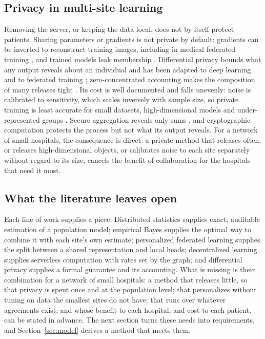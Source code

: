 \documentclass[acmsmall,screen,review]{acmart}
\theoremstyle{acmdefinition}
\begin{document}
\subsection{Privacy in multi-site learning}\label{sec:dp}

Removing the server, or keeping the data local, does not by itself protect patients. Sharing parameters or gradients is not private by default: gradients can be inverted to reconstruct training images, including in medical federated training \cite{geiping2020inverting,hatamizadeh2023do,zhu2019deep}, and trained models leak membership \cite{shokri2017membership}. Differential privacy bounds what any output reveals about an individual \cite{dwork2006calibrating,dwork2014algorithmic} and has been adapted to deep learning \cite{abadi2016deep,mironov2017renyi} and to federated training \cite{mcmahan2018learning}; zero-concentrated accounting makes the composition of many releases tight \cite{bun2016concentrated}. Its cost is well documented and falls unevenly: noise is calibrated to sensitivity, which scales inversely with sample size, so private training is least accurate for small datasets, high-dimensional models and under-represented groups \cite{bagdasaryan2019differential,tramer2021differentially}. Secure aggregation reveals only sums \cite{bonawitz2017practical}, and cryptographic computation protects the process but not what its output reveals. For a network of small hospitals, the consequence is direct: a private method that releases often, or releases high-dimensional objects, or calibrates noise to each site separately without regard to its size, cancels the benefit of collaboration for the hospitals that need it most.

\subsection{What the literature leaves open}\label{sec:gap}

Each line of work supplies a piece. Distributed statistics supplies exact, auditable estimation of a population model; empirical Bayes supplies the optimal way to combine it with each site's own estimate; personalized federated learning supplies the split between a shared representation and local heads; decentralized learning supplies serverless computation with rates set by the graph; and differential privacy supplies a formal guarantee and its accounting. What is missing is their combination for a network of small hospitals: a method that releases little, so that privacy is spent once and at the population level; that personalizes without tuning on data the smallest sites do not have; that runs over whatever agreements exist; and whose benefit to each hospital, and cost to each patient, can be stated in advance. The next section turns these needs into requirements, and Section~\ref{sec:model} derives a method that meets them.
\end{document}
